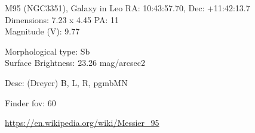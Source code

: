 \begin{block}{M95 (NGC3351), Galaxy in Leo}
    RA: 10:43:57.70, Dec: +11:42:13.7 \\ 
    Dimensions: 7.23 x 4.45 PA: 11 \\ 
    Magnitude (V): 9.77

    Morphological type: Sb \\ 
    Surface Brightness: 23.26 mag/arcsec2 

    Desc: (Dreyer) B, L, R, pgmbMN 

    Finder fov: 60 

    \url{https://en.wikipedia.org/wiki/Messier_95} 
\end{block}
